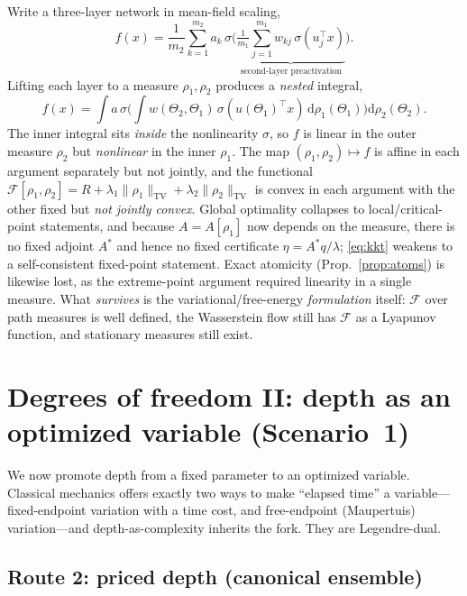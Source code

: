 \documentclass[11pt]{article}
\theoremstyle{definition}
\newcommand{\F}{\mathcal{F}}
\newcommand{\TV}{\mathrm{TV}}
\newcommand{\dd}{\mathrm{d}}
\begin{document}
Write a three-layer network in mean-field scaling,
\begin{equation}
f(x)=\frac{1}{m_2}\sum_{k=1}^{m_2}a_k\,
\sigma\!\Big(\underbrace{\tfrac{1}{m_1}\textstyle\sum_{j=1}^{m_1}w_{kj}\,\sigma(u_j^\top x)}_{\text{second-layer preactivation}}\Big).
\label{eq:three-layer}
\end{equation}
Lifting each layer to a measure $\rho_1,\rho_2$ produces a \emph{nested} integral,
\begin{equation}
f(x)=\int a\,\sigma\!\Big(\int w(\Theta_2,\Theta_1)\,\sigma(u(\Theta_1)^\top x)\,\dd\rho_1(\Theta_1)\Big)\dd\rho_2(\Theta_2).
\label{eq:nested}
\end{equation}
The inner integral sits \emph{inside} the nonlinearity $\sigma$, so $f$ is linear in the
outer measure $\rho_2$ but \emph{nonlinear} in the inner $\rho_1$. The map
$(\rho_1,\rho_2)\mapsto f$ is affine in each argument separately but not jointly, and the
functional $\F[\rho_1,\rho_2]=R+\lambda_1\|\rho_1\|_{\TV}+\lambda_2\|\rho_2\|_{\TV}$ is
convex in each argument with the other fixed but \emph{not jointly convex}. Global
optimality collapses to local/critical-point statements, and because $A=A[\rho_1]$ now
depends on the measure, there is no fixed adjoint $A^\ast$ and hence no fixed certificate
$\eta=A^\ast q/\lambda$; \eqref{eq:kkt} weakens to a self-consistent fixed-point
statement. Exact atomicity (Prop.~\ref{prop:atoms}) is likewise lost, as the
extreme-point argument required linearity in a single measure. What \emph{survives} is the
variational/free-energy \emph{formulation} itself: $\F$ over path measures is well defined,
the Wasserstein flow still has $\F$ as a Lyapunov function, and stationary measures still
exist.


\section{Degrees of freedom II: depth as an optimized variable (Scenario~1)}
\label{sec:scenario1}

We now promote depth from a fixed parameter to an optimized variable. Classical mechanics
offers exactly two ways to make ``elapsed time'' a variable---fixed-endpoint variation with
a time cost, and free-endpoint (Maupertuis) variation---and depth-as-complexity inherits the
fork. They are Legendre-dual.

\subsection{Route 2: priced depth (canonical ensemble)}
\label{sec:route2}
\end{document}
